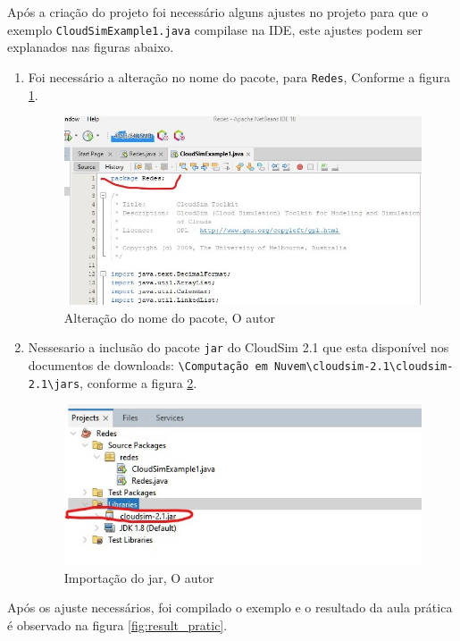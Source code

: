 \par Após a criação do projeto foi necessário alguns ajustes no projeto para que o exemplo \verb#CloudSimExample1.java# compilase na IDE, este ajustes podem ser explanados nas figuras abaixo.

\begin{enumerate}[label=\Roman{*}, ref=(\roman{*})]
  \item Foi necessário a alteração no nome do pacote, para \verb#Redes#, Conforme a figura \ref{fig:rename_pacote}. \newline
  \begin{figure}[h]
    \center
    \includegraphics[scale=.5]{figure/rename_pacote.jpg}
    \caption{Alteração do nome do pacote, O autor}
    \label{fig:rename_pacote}
  \end{figure}

  \item Nessesario a inclusão do pacote \verb#jar# do CloudSim 2.1 que esta disponível nos documentos de downloads: \verb#\Computação em Nuvem\cloudsim-2.1\cloudsim-2.1\jars#, conforme a figura \ref{fig:import_jar}. \newline
  \begin{figure}[h]
    \center
    \includegraphics[scale=.8]{figure/import_jar.jpg}
    \caption{Importação do jar, O autor}
    \label{fig:import_jar}
  \end{figure}
\end{enumerate}
\newpage
\par Após os ajuste necessários, foi compilado o exemplo e o resultado da aula prática é observado na figura \ref{fig:result_pratic}.

